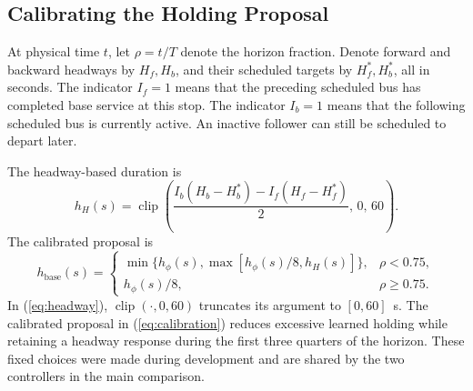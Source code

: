 \documentclass[letterpaper,journal]{IEEEtran}
\newcommand{\clip}{\operatorname{clip}}
\newcommand{\hbase}{h_{\mathrm{base}}}
\begin{document}
\subsection{Calibrating the Holding Proposal}
At physical time \(t\), let \(\rho=t/T\) denote the horizon fraction. Denote forward and backward headways by \(H_f,H_b\), and their scheduled targets by \(H_f^*,H_b^*\), all in seconds. The indicator \(I_f=1\) means that the preceding scheduled bus has completed base service at this stop. The indicator \(I_b=1\) means that the following scheduled bus is currently active. An inactive follower can still be scheduled to depart later.

The headway-based duration is
\begin{equation}
 h_H(s)=\clip\left(
 \frac{I_b(H_b-H_b^*)-I_f(H_f-H_f^*)}{2},\,0,\,60
 \right).
 \label{eq:headway}
\end{equation}
The calibrated proposal is
\begin{equation}
 \hbase(s)=
 \begin{cases}
 \min\{h_\phi(s),\max[h_\phi(s)/8,h_H(s)]\},&\rho<0.75,\\
 h_\phi(s)/8,&\rho\geq0.75.
 \end{cases}
 \label{eq:calibration}
\end{equation}
In (\ref{eq:headway}), \(\clip(\cdot,0,60)\) truncates its argument to \([0,60]\)~s. The calibrated proposal in (\ref{eq:calibration}) reduces excessive learned holding while retaining a headway response during the first three quarters of the horizon. These fixed choices were made during development and are shared by the two controllers in the main comparison.
\end{document}
